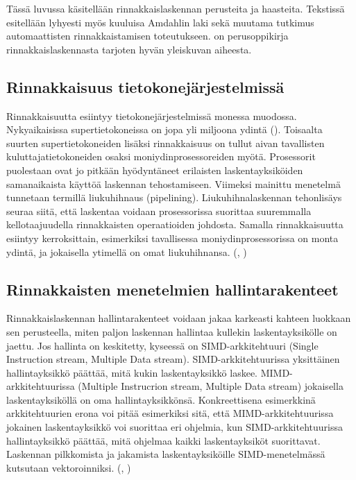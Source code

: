 Tässä luvussa käsitellään rinnakkaislaskennan perusteita ja haasteita.
Tekstissä esitellään lyhyesti
myös kuuluisa Amdahlin laki sekä muutama tutkimus automaattisten
rinnakkaistamisen toteutukseen. \citealt{intro} on perusoppikirja
rinnakkaislaskennasta tarjoten hyvän yleiskuvan aiheesta.

\subsection{Rinnakkaisuus tietokonejärjestelmissä}

Rinnakkaisuutta esiintyy tietokonejärjestelmissä monessa muodossa.
Nykyaikaisissa supertietokoneissa on jopa yli miljoona ydintä (\citealt{top500}).
Toisaalta suurten supertietokoneiden lisäksi rinnakkaisuus on tullut aivan tavallisten
kuluttajatietokoneiden osaksi moniydinprosessoreiden myötä. Prosessorit puolestaan ovat jo pitkään hyödyntäneet
erilaisten laskentayksiköiden samanaikaista käyttöä laskennan tehostamiseen.
Viimeksi mainittu menetelmä tunnetaan termillä liukuhihnaus (pipelining).
Liukuhihnalaskennan tehonlisäys seuraa siitä, että laskentaa voidaan
prosessorissa suorittaa suuremmalla kellotaajuudella rinnakkaisten operaatioiden
johdosta. Samalla rinnakkaisuutta esiintyy kerroksittain, esimerkiksi
tavallisessa moniydinprosessorissa on monta ydintä, ja jokaisella ytimellä on
omat liukuhihnansa. (\citealt{intro}, \citealt{rauber})

\subsection{Rinnakkaisten menetelmien hallintarakenteet}

Rinnakkaislaskennan hallintarakenteet voidaan jakaa karkeasti kahteen luokkaan sen perusteella,
miten paljon laskennan hallintaa kullekin laskentayksikölle on jaettu. Jos
hallinta on keskitetty, kyseessä on SIMD-arkkitehtuuri (Single Instruction
stream, Multiple Data stream). SIMD-arkkitehtuurissa yksittäinen
hallintayksikkö päättää, mitä kukin laskentayksikkö laskee.
MIMD-arkkitehtuurissa (Multiple Instrucrion stream, Multiple Data stream)
jokaisella laskentayksiköllä on oma hallintayksikkönsä. Konkreettisena
esimerkkinä arkkitehtuurien erona voi pitää esimerkiksi sitä, että
MIMD-arkkitehtuurissa jokainen laskentayksikkö voi suorittaa eri ohjelmia, kun
SIMD-arkkitehtuurissa hallintayksikkö päättää, mitä ohjelmaa kaikki
laskentayksiköt suorittavat. Laskennan pilkkomista ja jakamista
laskentayksiköille SIMD-menetelmässä kutsutaan vektoroinniksi. (\citealt{intro}, \citealt{rauber})

